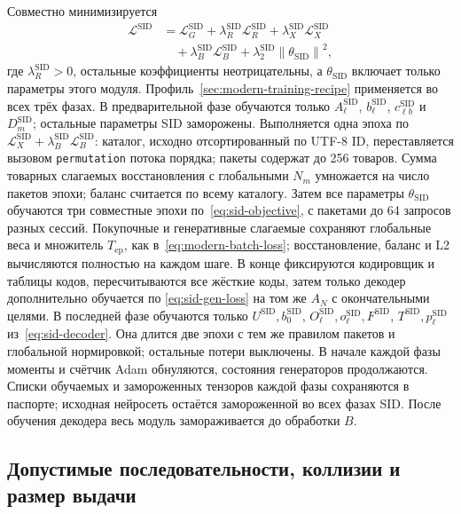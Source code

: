 \documentclass[12pt,a4paper]{article}
\newcommand{\code}[1]{{\ttfamily\small\nolinkurl{#1}}}
\newcommand{\norm}[1]{\left\lVert#1\right\rVert}
\theoremstyle{plainru}
\begin{document}
Совместно минимизируется
\begin{align}\label{eq:sid-objective}
 \mathcal L^{\mathrm{SID}}
 &=\mathcal L_G^{\mathrm{SID}}
  +\lambda_R^{\mathrm{SID}}\mathcal L_R^{\mathrm{SID}}
  +\lambda_X^{\mathrm{SID}}\mathcal L_X^{\mathrm{SID}}
  \nonumber\\
 &\quad+\lambda_B^{\mathrm{SID}}\mathcal L_B^{\mathrm{SID}}
  +\lambda_2^{\mathrm{SID}}\norm{\theta_{\mathrm{SID}}}^{2},
\end{align}
где $\lambda_R^{\mathrm{SID}}>0$, остальные коэффициенты неотрицательны,
а $\theta_{\mathrm{SID}}$ включает только параметры этого модуля.
Профиль~\ref{sec:modern-training-recipe} применяется во всех трёх фазах.
В предварительной фазе обучаются только $A_\ell^{\mathrm{SID}}$,
$b_\ell^{\mathrm{SID}}$, $c_{\ell b}^{\mathrm{SID}}$ и $D_m^{\mathrm{SID}}$;
остальные параметры SID заморожены. Выполняется одна эпоха по
$\mathcal L_X^{\mathrm{SID}}+\lambda_B^{\mathrm{SID}}\mathcal L_B^{\mathrm{SID}}$:
каталог, исходно отсортированный по UTF-8 ID, переставляется вызовом
\code{permutation} потока порядка; пакеты содержат до 256 товаров.
Сумма товарных слагаемых восстановления с глобальными $N_m$
умножается на число пакетов эпохи; баланс считается по всему каталогу.
Затем все параметры $\theta_{\mathrm{SID}}$ обучаются три совместные
эпохи по~\eqref{eq:sid-objective},
с пакетами до 64 запросов разных сессий. Покупочные и генеративные
слагаемые сохраняют глобальные веса и множитель $T_{\mathrm{ep}}$,
как в~\eqref{eq:modern-batch-loss}; восстановление, баланс и L2
вычисляются полностью на каждом шаге.
В конце фиксируются кодировщик и таблицы кодов, пересчитываются
все жёсткие коды, затем только декодер дополнительно обучается
по \eqref{eq:sid-gen-loss} на том же $A_N$ с окончательными целями.
В последней фазе обучаются только $U^{\mathrm{SID}},b_0^{\mathrm{SID}}$,
$O_\ell^{\mathrm{SID}},o_\ell^{\mathrm{SID}},F^{\mathrm{SID}}$,
$T^{\mathrm{SID}},p_\ell^{\mathrm{SID}}$ из~\eqref{eq:sid-decoder}.
Она длится две эпохи с тем же правилом пакетов
и глобальной нормировкой; остальные потери выключены.
В начале каждой фазы моменты и счётчик Adam обнуляются,
состояния генераторов продолжаются. Списки обучаемых и замороженных
тензоров каждой фазы сохраняются в паспорте; исходная нейросеть
остаётся замороженной во всех фазах SID.
После обучения декодера весь модуль замораживается до обработки $B$.

\subsection{Допустимые последовательности, коллизии и размер выдачи}
\label{sec:sid-serving}
\end{document}
